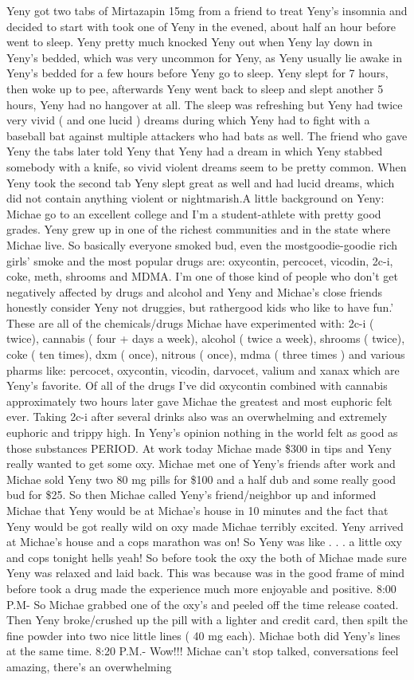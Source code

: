 \documentclass[12pt]{book}
\begin{document}
Yeny got two tabs of Mirtazapin 15mg from a friend to treat Yeny's insomnia and decided to start with took one of Yeny in the evened, about half an hour before went to sleep. Yeny pretty much knocked Yeny out when Yeny lay down in Yeny's bedded, which was very uncommon for Yeny, as Yeny usually lie awake in Yeny's bedded for a few hours before Yeny go to sleep. Yeny slept for 7 hours, then woke up to pee, afterwards Yeny went back to sleep and slept another 5 hours, Yeny had no hangover at all. The sleep was refreshing but Yeny had twice very vivid ( and one lucid ) dreams during which Yeny had to fight with a baseball bat against multiple attackers who had bats as well. The friend who gave Yeny the tabs later told Yeny that Yeny had a dream in which Yeny stabbed somebody with a knife, so vivid violent dreams seem to be pretty common. When Yeny took the second tab Yeny slept great as well and had lucid dreams, which did not contain anything violent or nightmarish.A little background on Yeny: Michae go to an excellent college and I'm a student-athlete with pretty good grades. Yeny grew up in one of the richest communities and in the state where Michae live. So basically everyone smoked bud, even the mostgoodie-goodie rich girls' smoke and the most popular drugs are: oxycontin, percocet, vicodin, 2c-i, coke, meth, shrooms and MDMA. I'm one of those kind of people who don't get negatively affected by drugs and alcohol and Yeny and Michae's close friends honestly consider Yeny not druggies, but rathergood kids who like to have fun.' These are all of the chemicals/drugs Michae have experimented with: 2c-i ( twice), cannabis ( four + days a week), alcohol ( twice a week), shrooms ( twice), coke ( ten times), dxm ( once), nitrous ( once), mdma ( three times ) and various pharms like: percocet, oxycontin, vicodin, darvocet, valium and xanax which are Yeny's favorite. Of all of the drugs I've did oxycontin combined with cannabis approximately two hours later gave Michae the greatest and most euphoric felt ever. Taking 2c-i after several drinks also was an overwhelming and extremely euphoric and trippy high. In Yeny's opinion nothing in the world felt as good as those substances PERIOD. At work today Michae made \$300 in tips and Yeny really wanted to get some oxy. Michae met one of Yeny's friends after work and Michae sold Yeny two 80 mg pills for \$100 and a half dub and some really good bud for \$25. So then Michae called Yeny's friend/neighbor up and informed Michae that Yeny would be at Michae's house in 10 minutes and the fact that Yeny would be got really wild on oxy made Michae terribly excited. Yeny arrived at Michae's house and a cops marathon was on! So Yeny was like . . .  a little oxy and cops tonight hells yeah! So before took the oxy the both of Michae made sure Yeny was relaxed and laid back. This was because was in the good frame of mind before took a drug made the experience much more enjoyable and positive. 8:00 P.M- So Michae grabbed one of the oxy's and peeled off the time release coated. Then Yeny broke/crushed up the pill with a lighter and credit card, then spilt the fine powder into two nice little lines ( 40 mg each). Michae both did Yeny's lines at the same time. 8:20 P.M.- Wow!!! Michae can't stop talked, conversations feel amazing, there's an overwhelming 
\end{document}

